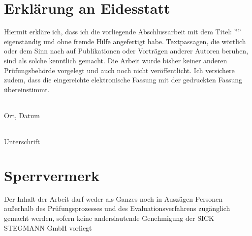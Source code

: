 \onehalfspacing
\section*{Erklärung an Eidesstatt}

Hiermit erkläre ich, dass ich die vorliegende Abschlussarbeit mit dem Titel:
\newline
	''\textit{\Titel{}}''
\newline
eigenständig und ohne fremde Hilfe angefertigt habe. Textpassagen, die wörtlich oder dem Sinn nach auf Publikationen oder Vorträgen anderer Autoren beruhen, sind als solche kenntlich gemacht. Die Arbeit wurde bisher keiner anderen Prüfungsbehörde vorgelegt und auch noch nicht veröffentlicht.
\newline
Ich versichere zudem, dass die eingereichte elektronische Fassung mit der gedruckten
Fassung übereinstimmt.

\vspace{4cm}
\parbox{5cm}{\centering \dotfill\\
\centering \footnotesize Ort, Datum} \hfill\parbox{5cm}{\dotfill\\
\centering \footnotesize Unterschrift}



\section*{Sperrvermerk}
Der Inhalt der Arbeit darf weder als Ganzes noch in Auszügen Personen außerhalb des Prüfungsprozesses und des Evaluationsverfahrens zugänglich gemacht werden, sofern keine anderslautende Genehmigung der SICK STEGMANN GmbH vorliegt
\newline

